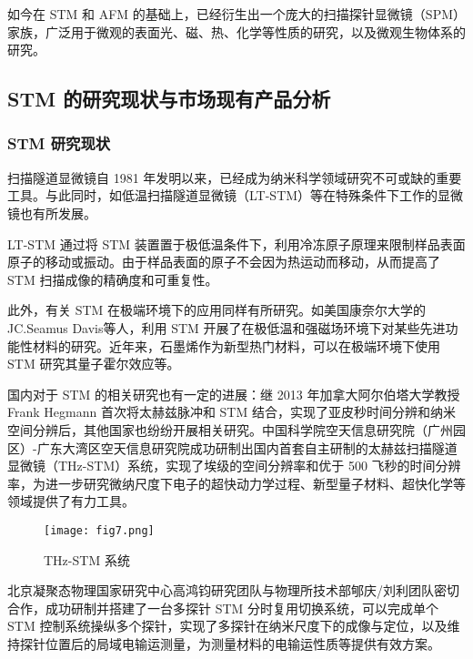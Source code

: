 \documentclass{article}
\begin{document}
\begin{spacing}{1.5}
	如今在 STM 和 AFM 的基础上，已经衍生出一个庞大的扫描探针显微镜（SPM）家族，广泛用于微观的表面光、磁、热、化学等性质的研究，以及微观生物体系的研究。
	
	
	\subsection{STM 的研究现状与市场现有产品分析}
	\subsubsection[STM 研究现状]{STM 研究现状}
	扫描隧道显微镜自 1981 年发明以来，已经成为纳米科学领域研究不可或缺的重要工具。与此同时，如低温扫描隧道显微镜（LT-STM）等在特殊条件下工作的显微镜也有所发展\cite{ref5,ref6,ref7}。
	
	LT-STM 通过将 STM 装置置于极低温条件下，利用冷冻原子原理来限制样品表面原子的移动或振动。由于样品表面的原子不会因为热运动而移动，从而提高了 STM 扫描成像的精确度和可重复性\cite{ref8}。
	
	此外，有关 STM 在极端环境下的应用同样有所研究\cite{ref1,ref2,ref3}。如美国康奈尔大学的 JC.Seamus Davis等人\cite{ref4}，利用 STM 开展了在极低温和强磁场环境下对某些先进功能性材料的研究。近年来，石墨烯作为新型热门材料，可以在极端环境下使用 STM 研究其量子霍尔效应等。
	
	国内对于 STM 的相关研究也有一定的进展：继 2013 年加拿大阿尔伯塔大学教授 Frank Hegmann 首次将太赫兹脉冲和 STM 结合，实现了亚皮秒时间分辨和纳米空间分辨后，其他国家也纷纷开展相关研究。中国科学院空天信息研究院（广州园区）-广东大湾区空天信息研究院成功研制出国内首套自主研制的太赫兹扫描隧道显微镜（THz-STM）系统，实现了埃级的空间分辨率和优于 500 飞秒的时间分辨率，为进一步研究微纳尺度下电子的超快动力学过程、新型量子材料、超快化学等领域提供了有力工具\cite{ref9}。
	
	\begin{figure}[htbp]
		\centering 
		\texttt{[image: fig7.png]}
		\caption{THz-STM 系统}
	\end{figure}
	
	北京凝聚态物理国家研究中心高鸿钧研究团队与物理所技术部郇庆/刘利团队密切合作，成功研制并搭建了一台多探针 STM 分时复用切换系统，可以完成单个 STM 控制系统操纵多个探针，实现了多探针在纳米尺度下的成像与定位，以及维持探针位置后的局域电输运测量\cite{ref10}，为测量材料的电输运性质等提供有效方案。
	
	
	

\end{spacing}
\end{document}
